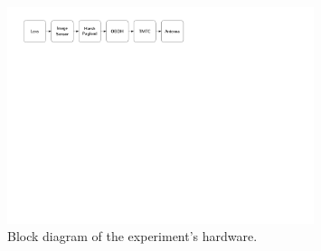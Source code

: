 \begin{figure}[!ht]
    \begin{center}
        \includegraphics[width=0.8\textwidth]{figures/experiment-block-diagram}
        \caption{Block diagram of the experiment's hardware.}
        \label{fig:experiment-block-diagram}
    \end{center}
\end{figure}

